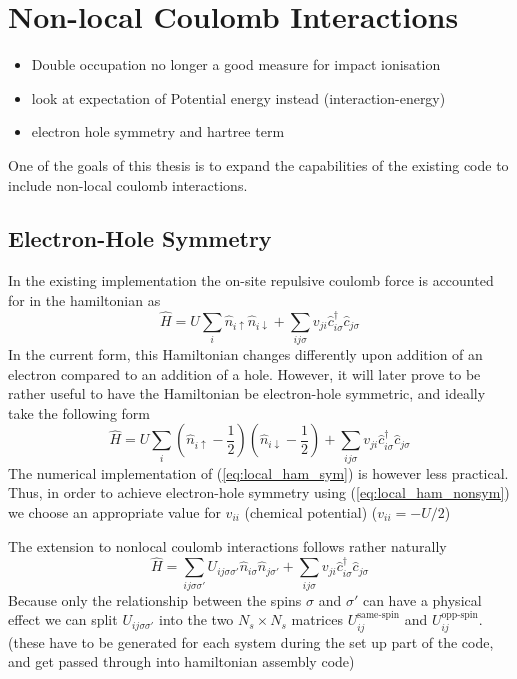\section{Non-local Coulomb Interactions}

\begin{itemize}
    \item Double occupation no longer a good measure for impact ionisation
    \item look at expectation of Potential energy instead (interaction-energy)
    \item electron hole symmetry and hartree term
\end{itemize}

One of the goals of this thesis is to expand the capabilities of the existing code to include non-local coulomb interactions. 

\subsection{Electron-Hole Symmetry}
In the existing implementation the on-site repulsive coulomb force is accounted for in the hamiltonian as
\begin{equation}
    \hat{H}=U \sum_{i} \hat{n}_{i \uparrow} \hat{n}_{i \downarrow}+\sum_{i j \sigma} v_{j i} \hat{c}_{i \sigma}^{\dagger} \hat{c}_{j \sigma}\label{eq:local_ham_nonsym}
\end{equation}
In the current form, this Hamiltonian changes differently upon addition of an electron compared to an addition of a hole. However, it will later prove to be rather useful to have the Hamiltonian be electron-hole symmetric, and ideally take the following form
\begin{equation}
    \hat{H} = U \sum_i \left(\hat{n}_{i\uparrow}-\frac{1}{2}\right)\left(\hat{n}_{i\downarrow}-\frac{1}{2}\right)+\sum_{i j \sigma} v_{j i} \hat{c}_{i \sigma}^{\dagger} \hat{c}_{j \sigma}\label{eq:local_ham_sym}
\end{equation}
 The numerical implementation of (\ref{eq:local_ham_sym}) is however less practical. Thus, in order to achieve electron-hole symmetry using (\ref{eq:local_ham_nonsym}) we choose an appropriate value for $v_{ii}$ (chemical potential) ($v_{ii} = -U / 2$)
 \medskip
 
 The extension to nonlocal coulomb interactions follows rather naturally
 \begin{equation}
    \hat{H}= \sum_{ij\sigma\sigma'} U_{ij\sigma\sigma'}\hat{n}_{i \sigma} \hat{n}_{j\sigma'}+\sum_{i j \sigma} v_{j i} \hat{c}_{i \sigma}^{\dagger} \hat{c}_{j \sigma}\label{eq:ham_nonsym}
\end{equation}
Because only the relationship between the spins $\sigma$ and $\sigma'$ can have a physical effect we can split $U_{ij\sigma\sigma'}$ into the two $N_s\times N_s$ matrices $U_{ij}^{\text{same-spin}}$ and $U_{ij}^{\text{opp-spin}}$. (these have to be generated for each system during the set up part of the code, and get passed through into hamiltonian assembly code)
\medskip

